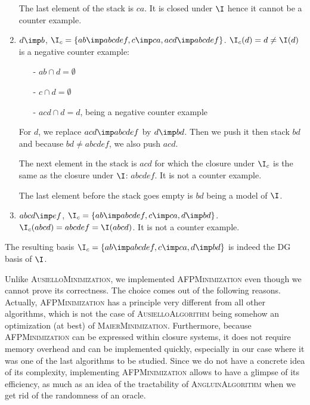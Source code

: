\begin{enumerate}
	The last element of the stack is $ca$. It is closed under $\I$ hence it cannot be a counter example.
	
	\item $d \imp b$, $\I_c = \{ ab \imp abcdef, c \imp ca, acd \imp abcdef \}$.
	$\I_c(d) = d \neq \I(d)$ is a negative counter example:
	\begin{itemize}
		\item[-] $ab \cap d = \emptyset$
		\item[-] $c \cap d = \emptyset$
		\item[-] $acd \cap d = d$, being a negative counter example
	\end{itemize}
	For $d$, we replace $acd \imp abcdef$ by $d \imp bd$. Then we push it then stack $bd$ and because $bd \neq abcdef$, we also push $acd$.
	
	The next element in the stack is $acd$ for which the closure under $\I_c$
	is the same as the closure under $\I$: $abcdef$. It is not a counter example.
	
	The last element before the stack goes empty is $bd$ being a model of $\I$.
	
	\item $abcd \imp ef$, $\I_c = \{ ab \imp abcdef, c \imp ca, d \imp bd \}$.
	$\I_c(abcd) = abcdef = \I(abcd)$. It is not a counter example.
\end{enumerate}
\noindent The resulting basis $\I_c =  \{ ab \imp abcdef, c \imp ca, d \imp bd \}$ is indeed the DG basis of $\I$.

\vspace{1.2em}

Unlike \textsc{AusielloMinimization}, we implemented \textsc{AFPMinimization}
even though we cannot prove its correctness. The choice comes out of the following reasons. Actually, \textsc{AFPMinimization} has a principle very
different from all other algorithms, which is not the case of \textsc{AusielloAlgorithm} being somehow an optimization (at best) of \textsc{MaierMinimization}. Furthermore, because \textsc{AFPMinimization} can be expressed within closure systems,
it does not require memory overhead and can be implemented quickly, especially in our case where it was one of the last algorithms to be studied. Since we do not have a concrete idea of its complexity, implementing \textsc{AFPMinimization} allows to have a glimpse of its efficiency, as much as
an idea of the tractability of \textsc{AngluinAlgorithm} when we get rid of 
the randomness of an oracle.

\vspace{1.2em}

